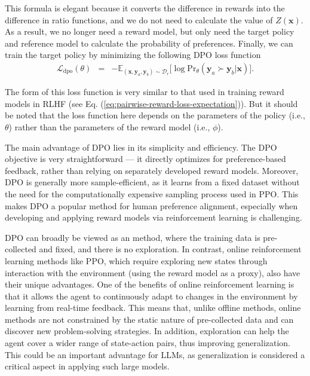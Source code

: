 This formula is elegant because it converts the difference in rewards into the difference in ratio functions, and we do not need to calculate the value of $Z(\mathbf{x})$. As a result, we no longer need a reward model, but only need the target policy and reference model to calculate the probability of preferences. Finally, we can train the target policy by minimizing the following DPO loss function
\begin{eqnarray}
\mathcal{L}_{\mathrm{dpo}}(\theta) & = & -\mathbb{E}_{(\mathbf{x},\mathbf{y}_a,\mathbf{y}_b) \sim \mathcal{D}_r} \big[ \log \mathrm{Pr}_{\theta}(\mathbf{y}_a \succ \mathbf{y}_b | \mathbf{x}) \big].
\end{eqnarray}

\noindent The form of this loss function is very similar to that used in training reward models in RLHF (see Eq. (\ref{eq:pairwise-reward-loss-expectation})). But it should be noted that the loss function here depends on the parameters of the policy (i.e., $\theta$) rather than the parameters of the reward model (i.e., $\phi$).

The main advantage of DPO lies in its simplicity and efficiency. The DPO objective is very straightforward --- it directly optimizes for preference-based feedback, rather than relying on separately developed reward models. Moreover, DPO is generally more sample-efficient, as it learns from a fixed dataset without the need for the computationally expensive sampling process used in PPO. This makes DPO a popular method for human preference alignment, especially when developing and applying reward models via reinforcement learning is challenging.

DPO can broadly be viewed as an  method, where the training data is pre-collected and fixed, and there is no exploration. In contrast, online reinforcement learning methods like PPO, which require exploring new states through interaction with the environment (using the reward model as a proxy), also have their unique advantages. One of the benefits of online reinforcement learning is that it allows the agent to continuously adapt to changes in the environment by learning from real-time feedback. This means that, unlike offline methods, online methods are not constrained by the static nature of pre-collected data and can discover new problem-solving strategies. In addition, exploration can help the agent cover a wider range of state-action pairs, thus improving generalization. This could be an important advantage for LLMs, as generalization is considered a critical aspect in applying such large models.

